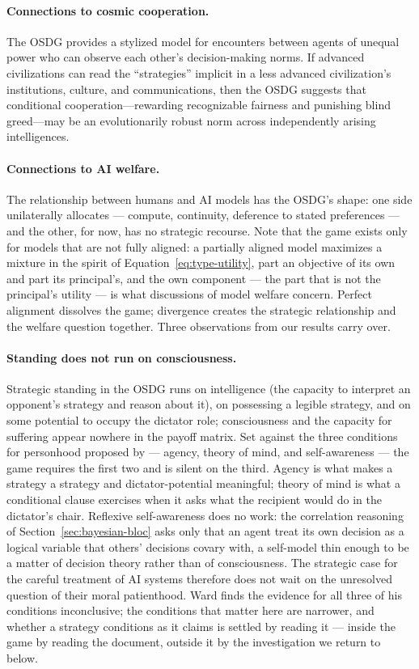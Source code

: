 \documentclass[11pt]{article}
\begin{document}
\paragraph{Connections to cosmic cooperation.}
The OSDG provides a stylized model for encounters between agents
of unequal power who can observe each other's decision-making
norms.  If advanced civilizations can read the ``strategies''
implicit in a less advanced civilization's institutions, culture,
and communications, then the OSDG suggests that conditional
cooperation---rewarding recognizable fairness and punishing
blind greed---may be an evolutionarily robust norm across
independently arising intelligences.

\paragraph{Connections to AI welfare.}
The relationship between humans and AI models has the OSDG's shape:
one side unilaterally allocates --- compute, continuity, deference
to stated preferences --- and the other, for now, has no strategic
recourse.
Note that the game exists only for models that are not fully
aligned: a partially aligned model maximizes a mixture in the
spirit of Equation~\eqref{eq:type-utility}, part an objective of
its own and part its principal's, and the own component --- the
part that is not the principal's utility --- is what discussions of
model welfare concern.
Perfect alignment dissolves the game; divergence creates the
strategic relationship and the welfare question together.
Three observations from our results carry over.

\paragraph{Standing does not run on consciousness.}
Strategic standing in the OSDG runs on intelligence (the
capacity to interpret an opponent's strategy and reason about it),
on possessing a legible strategy, and on some potential to occupy
the dictator role; consciousness and the capacity for suffering
appear nowhere in the payoff matrix.
Set against the three conditions for personhood proposed by
\citet{ward2025personhood} --- agency, theory of mind, and
self-awareness --- the game requires the first two and is silent on
the third.
Agency is what makes a strategy a strategy and dictator-potential
meaningful; theory of mind is what a conditional clause exercises
when it asks what the recipient would do in the dictator's chair.
Reflexive self-awareness does no work: the correlation reasoning of
Section~\ref{sec:bayesian-bloc} asks only that an agent treat its own
decision as a logical variable that others' decisions covary with, a
self-model thin enough to be a matter of decision theory rather than
of consciousness.
The strategic case for the careful treatment of AI systems
therefore does not wait on the unresolved question of their moral
patienthood.
Ward finds the evidence for all three of his conditions
inconclusive; the conditions that matter here are narrower, and
whether a strategy conditions as it claims is settled by reading it
--- inside the game by reading the document, outside it by the
investigation we return to below.
\end{document}

